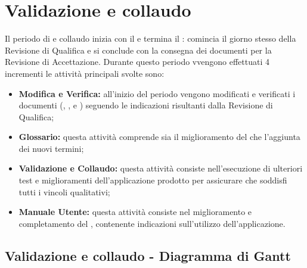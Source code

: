 \documentclass[PianoDiProgetto.tex]{subfiles}
\begin{document}
\section{Validazione e collaudo}
Il periodo di  e collaudo inizia con il  e termina il : comincia il giorno stesso della Revisione di Qualifica e si conclude con la consegna dei documenti per la Revisione di Accettazione. Durante questo periodo vvengono effettuati 4 incrementi le attività principali svolte sono:
\begin{itemize}
\item \textbf{Modifica e Verifica:} all'inizio del periodo vengono modificati e verificati  i documenti (\ndp, \pdp, \pdq e \pb) seguendo le indicazioni risultanti dalla Revisione di Qualifica;
\item \textbf{Glossario:} questa attività comprende sia il miglioramento del \g che l'aggiunta dei nuovi termini;
\item \textbf{Validazione e Collaudo:} questa attività consiste nell'esecuzione di ulteriori test e miglioramenti dell'applicazione prodotto per assicurare che soddisfi tutti i vincoli qualitativi;
\item \textbf{Manuale Utente:} questa attività consiste nel miglioramento e completamento del \mut, contenente indicazioni sull'utilizzo dell'applicazione.

\end{itemize}
\begin{landscape}
\subsection{Validazione e collaudo - Diagramma di Gantt}
\end{landscape}	
\end{document}
